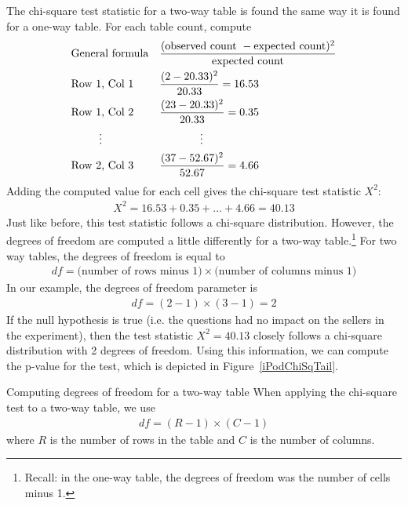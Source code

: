 The chi-square test statistic for a two-way table is found
the same way it is found for a one-way table.
For each table count, compute
\begin{align*}
&\text{General formula} &&
    \frac{(\text{observed count } - \text{expected count})^2}
        {\text{expected count}} \\
&\text{Row 1, Col 1} &&
    \frac{(\iPodAA - \iPodAExpected)^2}{\iPodAExpected} = 16.53 \\
&\text{Row 1, Col 2} &&
    \frac{(\iPodAB - \iPodAExpected)^2}{\iPodAExpected} = 0.35 \\
& \hspace{9mm}\vdots &&
    \hspace{13mm}\vdots \\
&\text{Row 2, Col 3} &&
    \frac{(\iPodBC - \iPodBExpected)^2}{\iPodBExpected} = 4.66
\end{align*}
Adding the computed value for each cell gives the chi-square test statistic $X^2$:
\begin{align*}
X^2 = 16.53 + 0.35 + \dots + 4.66 = 40.13
\end{align*}
Just like before, this test statistic follows a chi-square distribution. However, the degrees of freedom are computed a little differently for a two-way table.\footnote{Recall: in the one-way table, the degrees of freedom was the number of cells minus 1.} For two way tables, the degrees of freedom is equal to
\begin{align*}
df = \text{(number of rows minus 1)}\times \text{(number of columns minus 1)}
\end{align*}
In our example, the degrees of freedom parameter is
\begin{align*}
df = (2-1)\times (3-1) = 2
\end{align*}
If the null hypothesis is true
(i.e. the questions had no impact on the sellers in
    the experiment),
then the test statistic $X^2 = 40.13$ closely follows
a chi-square distribution with 2 degrees of freedom.
Using this information, we can compute the p-value for
the test, which is depicted in
Figure~\ref{iPodChiSqTail}.

\begin{onebox}{Computing degrees of freedom for a two-way table}
  When applying the chi-square test to a two-way table,
  we use
  \begin{align*}
  df = (R-1)\times (C-1)
  \end{align*}
  where $R$ is the number of rows in the table
  and $C$ is the number of columns.
\end{onebox}


